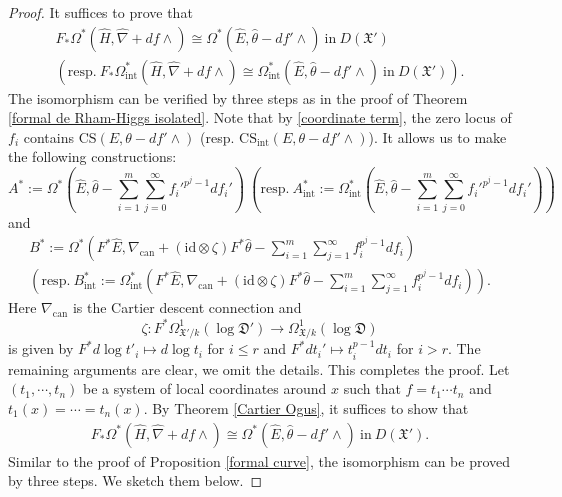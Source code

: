 \documentclass[12pt, a4paper]{article}
\begin{document}
\begin{proof}
  It suffices to prove that
$$
\begin{array}{c}
 F_*\Omega^*(\hat H,\hat\nabla+df\wedge)\cong\Omega^*(\hat E,\hat\theta-df'\wedge)~\mathrm{in}~D(\mathfrak X')\\
 (\mathrm{resp.}~F_*\Omega_\mathrm{int}^*(\hat H,\hat\nabla+df\wedge)\cong\Omega_\mathrm{int}^*(\hat E,\hat\theta-df'\wedge)~\mathrm{in}~D(\mathfrak X')).
 \end{array}
 $$
 The isomorphism can be verified by three steps as in the proof of Theorem \ref{formal de Rham-Higgs isolated}. Note that by \eqref{coordinate term}, the zero locus of $f_i$ contains $\mathrm{CS}(E,\theta-df'\wedge)$ (resp. $\mathrm{CS}_\mathrm{int}(E,\theta-df'\wedge)$). It allows us to make the following constructions:
 $$
 A^*:=\Omega^*(\hat E,\hat\theta-\sum_{i=1}^m\sum_{j=0}^\infty f_i'^{p^j-1}df_i')~(\mathrm{resp.}~A^*_\mathrm{int}:=\Omega_\mathrm{int}^*(\hat E,\hat\theta-\sum_{i=1}^m\sum_{j=0}^\infty f_i'^{p^j-1}df_i'))
 $$
 and 
 $$
 \begin{array}{c}
 B^*:=\Omega^*(F^*\hat E,\nabla_{\mathrm{can}}+(\mathrm{id}\otimes\zeta)F^*\hat\theta-\sum_{i=1}^m\sum_{j=1}^\infty f_i^{p^j-1}df_i)\\
 (\mathrm{resp.}~B_\mathrm{int}^*:=\Omega_\mathrm{int}^*(F^*\hat E,\nabla_{\mathrm{can}}+(\mathrm{id}\otimes\zeta)F^*\hat\theta-\sum_{i=1}^m\sum_{j=1}^\infty f_i^{p^j-1}df_i)).
 \end{array}
 $$
 Here  $\nabla_\mathrm{can}$ is the Cartier descent connection and 
$$\zeta:F^*\Omega^1_{\mathfrak X'/k}(\log\mathfrak D')\to\Omega^1_{\mathfrak X/k}(\log\mathfrak D)$$ is given by $F^*d\log t'_i\mapsto d\log t_i$ for $i\leq r$ and $F^*dt_i'\mapsto t_i^{p-1}dt_i$ for $i>r$. The remaining arguments are clear, we omit the details. This completes the proof.
\iffalse
  Let $(t_1,\cdots,t_n)$ be a system of local coordinates around $x$ such that $f=t_1\cdots t_n$  and $t_1(x)=\cdots=t_n(x)$. By Theorem \ref{Cartier Ogus}, it suffices to show that 
 \begin{eqnarray}\label{twisted de Rham-Higgs higher dimension}
 F_*\Omega^*(\hat H,\hat\nabla+df\wedge)\cong\Omega^*(\hat E,\hat\theta-df'\wedge)~\mathrm{in}~D(\mathfrak X').
 \end{eqnarray}
 Similar to the proof of Proposition \ref{formal curve}, the isomorphism can be proved by three steps. We sketch them below.
 

\end{proof}
\end{document}
